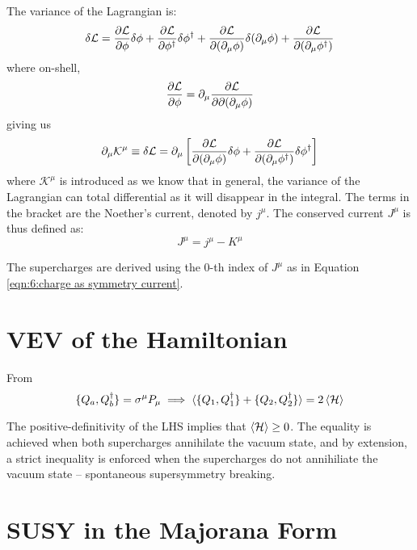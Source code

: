 The variance of the Lagrangian is:
\begin{equation}
    \delta \mathcal{L} = \frac{\partial {\mathcal{L}}}{\partial {\phi}} \delta \phi + \frac{\partial {\mathcal{L}}}{\partial {\phi^\dagger}} \delta \phi^\dagger + \frac{\partial {\mathcal{L}}}{\partial {(\partial_\mu \phi)}} \delta (\partial_\mu \phi) + \frac{\partial {\mathcal{L}}}{\partial {(\partial_\mu \phi^\dagger)}}
\end{equation}
where on-shell, 
\begin{equation}
    \frac{\partial {\mathcal{L}}}{\partial {\phi}} = \partial_\mu \frac{\partial {\mathcal{L}}}{\partial {\partial(\partial_\mu \phi)}}
\end{equation}
giving us
\begin{equation}
    \partial_\mu \mathcal{K^\mu} \equiv \delta \mathcal{L} = \partial_\mu \left[ \frac{\partial {\mathcal{L}}}{\partial {(\partial_\mu \phi)}} \delta \phi + \frac{\partial {\mathcal{L}}}{\partial {(\partial_\mu \phi^\dagger)}} \delta \phi^\dagger \right]
\end{equation}
where $\mathcal{K^\mu}$ is introduced as we know that in general, the variance of the Lagrangian can total differential as it will disappear in the integral. The terms in the bracket are the Noether's current, denoted by $j^\mu$. The conserved current $J^\mu$ is thus defined as:
\begin{equation}
    J^\mu = j^\mu - K^\mu
    \label{eqn:7:symmetry current}
\end{equation}

The supercharges are derived using the 0-th index of $J^\mu$ as in Equation \ref{eqn:6:charge as symmetry current}.

\section{VEV of the Hamiltonian}
\label{ch:7:vev of hamiltonian}
From
\begin{equation}
    \{Q_a, Q_b^\dagger\} = \sigma^\mu P_\mu \implies \braket{\{Q_1, Q_1^\dagger\} + \{Q_2, Q_2^\dagger\}} = 2 \braket{\mathcal{H}}
\end{equation}

The positive-definitivity of the LHS implies that $\braket{\mathcal{H}} \geq 0$. The equality is achieved when both supercharges annihilate the vacuum state, and by extension, a strict inequality is enforced when the supercharges do not annihiliate the vacuum state -- spontaneous supersymmetry breaking.

\section{SUSY in the Majorana Form}
\label{ch:7:susy in majorana form}

